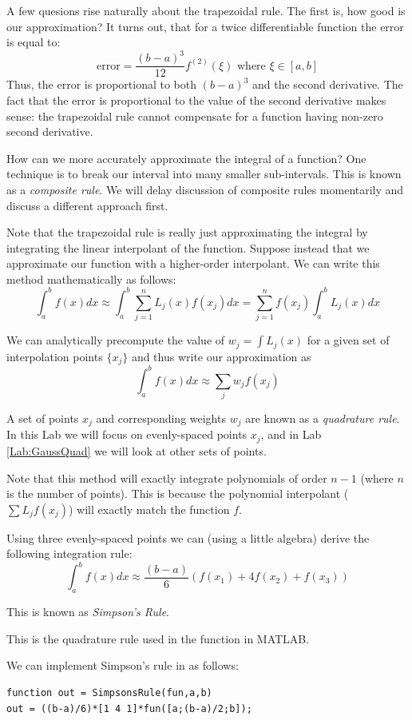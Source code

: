 A few quesions rise naturally about the trapezoidal rule. The first is, how good is our approximation? It turns out, that for a twice differentiable function the error is equal to:
\[
\mbox{error} = \frac{(b-a)^3}{12}f^{(2)}(\xi) \mbox{ where } \xi \in [a,b]
\]
Thus, the error is proportional to both $(b-a)^3$ and the second derivative. The fact that the error is proportional to the value of the second derivative makes sense: the trapezoidal rule cannot compensate for a function having non-zero second derivative.

How can we more accurately approximate the integral of a function? One technique is to break our interval into many smaller sub-intervals. This is known as a \emph{composite rule}. We will delay discussion of composite rules momentarily and discuss a different approach first.

Note that the trapezoidal rule is really just approximating the integral by integrating the linear interpolant of the function. Suppose instead that we approximate our function with a higher-order interpolant. We can write this method mathematically as follows:
\[
\int_a^b f(x) dx \approx \int_a^b \sum_{j=1}^n L_j(x)f(x_j) dx = \sum_{j=1}^n f(x_j)\int_a^b L_j(x) dx
\]

We can analytically precompute the value of $w_j = \int L_j(x)$ for a given set of interpolation points $\{x_j\}$ and thus write our approximation as
\[
\int_a^b f(x) dx \approx \sum_j w_j f(x_j)
\]

A set of points $x_j$ and corresponding weights $w_j$ are known as a \emph{quadrature rule}. In this Lab we will focus on evenly-spaced points $x_j$, and in Lab \ref{Lab:GaussQuad} we will look at other sets of points.

Note that this method will exactly integrate polynomials of order $n-1$ (where $n$ is the number of points). This is because the polynomial interpolant ($\sum L_j f(x_j)$) will exactly match the function $f$.

Using three evenly-spaced points we can (using a little algebra) derive the following integration rule:
\[
\int_a^b f(x) dx \approx \frac{(b-a)}{6}\left(f(x_1) + 4 f(x_2) + f(x_3)\right)
\]

This is known as \emph{Simpson's Rule}. \begin{matlab} This is the quadrature rule used in the  function in MATLAB.\end{matlab} We can implement Simpson's rule in \ProgrammingLanguage as follows:
\begin{matlab}
\begin{lstlisting}[style=matlab]
function out = SimpsonsRule(fun,a,b)
out = ((b-a)/6)*[1 4 1]*fun([a;(b-a)/2;b]);
\end{lstlisting}
\end{matlab}

